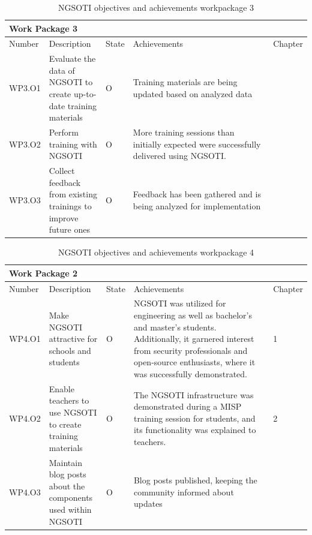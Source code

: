 \begin{table}
    \begin{tabular}{ |p{0.07\linewidth}  |p{0.2\linewidth}| p{0.04\linewidth}| p{0.62\linewidth}|  p{0.07\linewidth}| }
    \hline
    \multicolumn{5}{|p{0.97\linewidth}|}{Work Package 3} \\
    \hline
    Number & Description & State & Achievements & Chapter \\
    \hline
    WP3.O1 & Evaluate the data of NGSOTI to create up-to-date training materials & O & Training materials are being updated based on analyzed data & \\
    \hline
    WP3.O2 & Perform training with NGSOTI & O &  More training sessions than initially expected were successfully delivered using NGSOTI. &  \\
    \hline
    WP3.O3 & Collect feedback from existing trainings to improve future ones & O & Feedback has been gathered and is being analyzed for implementation &  \\
    \hline
    \end{tabular}
    \caption{NGSOTI objectives and achievements workpackage 3}
    \label{oa3}
\end{table}


\begin{table}
        \begin{tabular}{ |p{0.07\linewidth}  |p{0.2\linewidth}| p{0.04\linewidth}| p{0.62\linewidth}|  p{0.07\linewidth}| }
        \hline
        \multicolumn{5}{|p{0.97\linewidth}|}{Work Package 2} \\
        \hline
        Number & Description & State & Achievements & Chapter \\
        \hline
        WP4.O1 & Make NGSOTI attractive for schools and students & O &NGSOTI was
        utilized for engineering as well as bachelor’s and master’s students.
        Additionally, it garnered interest from security professionals and open-source
        enthusiasts, where it was successfully demonstrated.  & 1 \\
        \hline
        WP4.O2 & Enable teachers to use NGSOTI to create training materials & O &
        The NGSOTI infrastructure was demonstrated during a MISP training session for
        students, and its functionality was explained to teachers. & 2 \\
        \hline
        WP4.O3 & Maintain blog posts about the components used within NGSOTI & O &
        Blog posts published, keeping the community informed about updates &  \\
        \hline
        \end{tabular}
    \caption{NGSOTI objectives and achievements workpackage 4}
\end{table}

